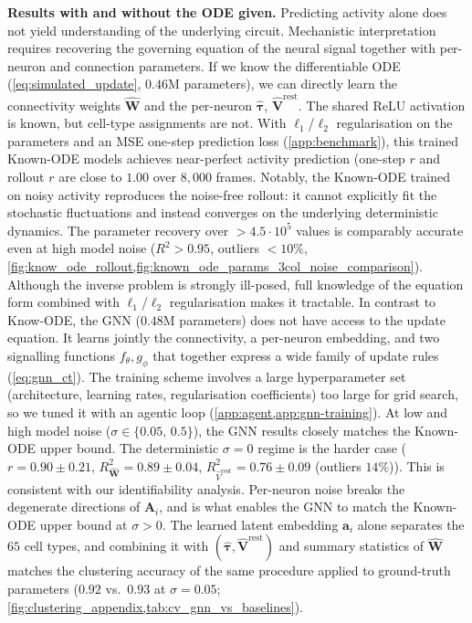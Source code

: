 \documentclass{article}
\begin{document}
\textbf{Results with and without the ODE given.}
Predicting activity alone does not yield understanding of the underlying
circuit. Mechanistic interpretation requires recovering the governing
equation of the neural signal together with per-neuron and
connection parameters. If we know the differentiable ODE (\cref{eq:simulated_update}, $0.46$M parameters), we can directly learn the connectivity weights $\hat{\mathbf{W}}$ and the per-neuron $\hat{\boldsymbol{\tau}}$, $\hat{\mathbf{V}}^{\mathrm{rest}}$. The shared ReLU
activation is known, but cell-type assignments are not. With $\ell_1$/$\ell_2$ regularisation on the parameters and an
MSE one-step prediction loss (\cref{app:benchmark}), this trained 
Known-ODE models achieves near-perfect activity prediction (one-step $r$ and rollout $r$ are close to $1.00$ over $8{,}000$ frames. Notably, the Known-ODE trained on noisy activity reproduces the noise-free rollout: it cannot explicitly fit the stochastic fluctuations and instead converges on the underlying
deterministic dynamics. The parameter recovery over $> 4.5\cdot 10^5$
values is comparably accurate even at high model noise ($R^2>0.95$, outliers $<10\%$, \cref{fig:know_ode_rollout,fig:known_ode_params_3col_noise_comparison}).
Although the inverse problem is strongly ill-posed, full knowledge
of the equation form combined with $\ell_1$/$\ell_2$ regularisation
makes it tractable.
In contrast to Know-ODE, the GNN ($0.48$M parameters) does not have access to the update equation. It learns jointly the connectivity, a per-neuron embedding, and two
signalling functions $f_\theta, g_\phi$ that together express a wide
family of update rules (\cref{eq:gnn_ct}). The training scheme involves a large hyperparameter set (architecture, learning rates, regularisation coefficients) too large
for grid search, so we tuned it with an agentic loop (\cref{app:agent,app:gnn-training}). At low and high model noise ($\sigma \in \{0.05,\,0.5\}$), the GNN results closely matches the Known-ODE upper bound. The deterministic
$\sigma=0$ regime is the harder case ($r=0.90\pm 0.21$,
$R^2_{\hat{\mathbf{W}}}=0.89\pm 0.04$, $R^2_{\hat{V}^{\mathrm{rest}}}=0.76\pm 0.09$ (outliers $14\%$)). This is consistent with our identifiability analysis. Per-neuron
noise breaks the degenerate directions of $\mathbf{A}_i$, and is
what enables the GNN to match the Known-ODE upper bound at
$\sigma > 0$. The learned latent embedding $\mathbf{a}_i$ alone separates the $65$
cell types, and combining it with $(\hat{\boldsymbol{\tau}},
\hat{\mathbf{V}}^{\mathrm{rest}})$ and summary statistics of
$\hat{\mathbf{W}}$ matches the clustering accuracy of the same
procedure applied to ground-truth parameters
($0.92$ vs.\ $0.93$ at $\sigma = 0.05$;
\cref{fig:clustering_appendix,tab:cv_gnn_vs_baselines}).
\end{document}
